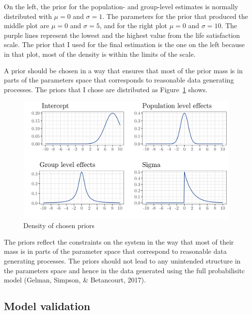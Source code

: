\documentclass[a4, 12pt]{article}
\begin{document}
On the left, the prior for the population- and group-level estimates is normally distributed with \(\mu=0\) and \(\sigma=1\). The parameters for the prior that produced the middle plot are \(\mu=0\) and \(\sigma=5\), and for the right plot \(\mu=0\) and \(\sigma=10\). The purple lines represent the lowest and the highest value from the life satisfaction scale. The prior that I used for the final estimation is the one on the left because in that plot, most of the density is within the limits of the scale.

A prior should be chosen in a way that ensures that most of the prior mass is in parts of the parameters space that corresponds to reasonable data generating processes. The priors that I chose are distributed as Figure~\ref{fig:chosen-priors} shows.

\begin{figure}[H]

{\centering \includegraphics[width=0.8\linewidth,]{../figures/plot_priors} 

}

\caption{Density of chosen priors}\label{fig:chosen-priors}
\end{figure}

The priors reflect the constraints on the system in the way that most of their mass is in parts of the parameter space that correspond to reasonable data generating processes. The priors should not lead to any unintended structure in the parameters space and hence in the data generated using the full probabilisitc model (Gelman, Simpson, \& Betancourt, 2017).

\hypertarget{model-validation}{%
\subsection{Model validation}\label{model-validation}}
\end{document}
